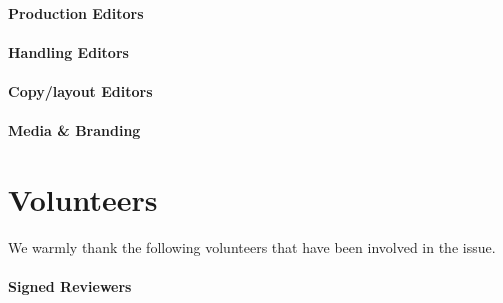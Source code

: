 \documentclass[]{seismica_cover}
\begin{document}
\paragraph{Production Editors}

\paragraph{Handling Editors}

\paragraph{Copy/layout Editors}

\paragraph{Media \& Branding}

\section*{Volunteers}
We warmly thank the following volunteers that have been involved in the issue.

\paragraph{Signed Reviewers}

\end{document}
